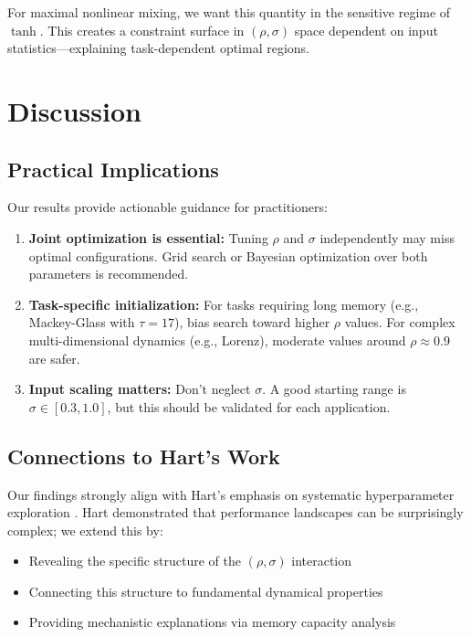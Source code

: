 \documentclass[11pt]{article}
\begin{document}
For maximal nonlinear mixing, we want this quantity in the sensitive regime of $\tanh$. This creates a constraint surface in $(\rho, \sigma)$ space dependent on input statistics—explaining task-dependent optimal regions.

\section{Discussion}

\subsection{Practical Implications}

Our results provide actionable guidance for practitioners:

\begin{enumerate}
    \item \textbf{Joint optimization is essential:} Tuning $\rho$ and $\sigma$ independently may miss optimal configurations. Grid search or Bayesian optimization over both parameters is recommended.
    
    \item \textbf{Task-specific initialization:} For tasks requiring long memory (e.g., Mackey-Glass with $\tau=17$), bias search toward higher $\rho$ values. For complex multi-dimensional dynamics (e.g., Lorenz), moderate values around $\rho \approx 0.9$ are safer.
    
    \item \textbf{Input scaling matters:} Don't neglect $\sigma$. A good starting range is $\sigma \in [0.3, 1.0]$, but this should be validated for each application.
\end{enumerate}

\subsection{Connections to Hart's Work}

Our findings strongly align with Hart's emphasis on systematic hyperparameter exploration \cite{hart2022exploring}. Hart demonstrated that performance landscapes can be surprisingly complex; we extend this by:

\begin{itemize}
    \item Revealing the specific structure of the $(\rho, \sigma)$ interaction
    \item Connecting this structure to fundamental dynamical properties
    \item Providing mechanistic explanations via memory capacity analysis
\end{itemize}
\end{document}
